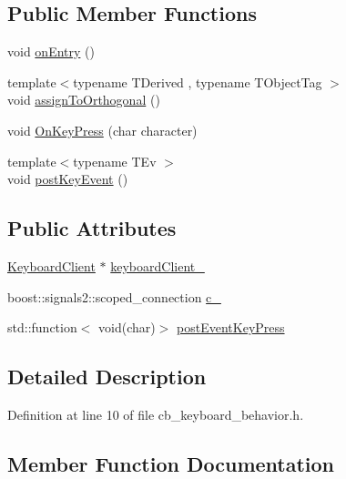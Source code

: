 \subsection*{Public Member Functions}
\begin{DoxyCompactItemize}
\item 
void \hyperlink{classsm__three__some_1_1CbKeyboard_af5fe2932db5f471afa125cae35362ba7}{on\+Entry} ()
\item 
{\footnotesize template$<$typename T\+Derived , typename T\+Object\+Tag $>$ }\\void \hyperlink{classsm__three__some_1_1CbKeyboard_ab8f25de5cc879e4459e896a2a47917fe}{assign\+To\+Orthogonal} ()
\item 
void \hyperlink{classsm__three__some_1_1CbKeyboard_a28bdbe8a69cabc44933f601061331cbf}{On\+Key\+Press} (char character)
\item 
{\footnotesize template$<$typename T\+Ev $>$ }\\void \hyperlink{classsm__three__some_1_1CbKeyboard_a02cbcf0db3b509c78b545e9f1d3ef313}{post\+Key\+Event} ()
\end{DoxyCompactItemize}
\subsection*{Public Attributes}
\begin{DoxyCompactItemize}
\item 
\hyperlink{classsm__three__some_1_1KeyboardClient}{Keyboard\+Client} $\ast$ \hyperlink{classsm__three__some_1_1CbKeyboard_a00f70614cf0c1e10f4214cf24b1d4013}{keyboard\+Client\+\_\+}
\item 
boost\+::signals2\+::scoped\+\_\+connection \hyperlink{classsm__three__some_1_1CbKeyboard_a6b6a885c39f32f29e907cfbc37b08b6f}{c\+\_\+}
\item 
std\+::function$<$ void(char)$>$ \hyperlink{classsm__three__some_1_1CbKeyboard_a746c413234e920c55625d63f4a6be784}{post\+Event\+Key\+Press}
\end{DoxyCompactItemize}


\subsection{Detailed Description}


Definition at line 10 of file cb\+\_\+keyboard\+\_\+behavior.\+h.



\subsection{Member Function Documentation}
